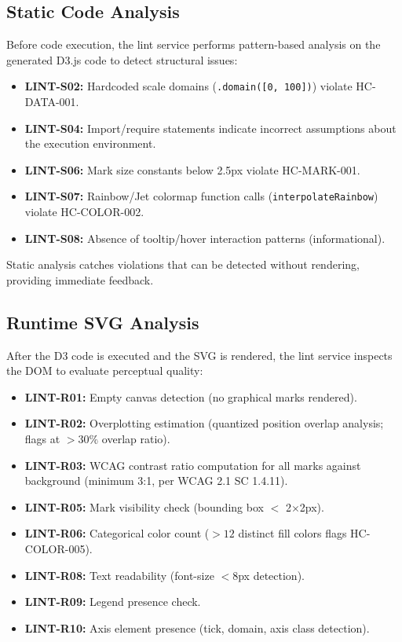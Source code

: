 \documentclass[journal]{vgtc}
\begin{document}
\subsection{Static Code Analysis}

Before code execution, the lint service performs pattern-based analysis on the generated D3.js code to detect structural issues:

\begin{itemize}
\item \textbf{LINT-S02:} Hardcoded scale domains (\texttt{.domain([0, 100])}) violate HC-DATA-001.
\item \textbf{LINT-S04:} Import/require statements indicate incorrect assumptions about the execution environment.
\item \textbf{LINT-S06:} Mark size constants below 2.5px violate HC-MARK-001.
\item \textbf{LINT-S07:} Rainbow/Jet colormap function calls (\texttt{interpolateRainbow}) violate HC-COLOR-002.
\item \textbf{LINT-S08:} Absence of tooltip/hover interaction patterns (informational).
\end{itemize}

Static analysis catches violations that can be detected without rendering, providing immediate feedback.

\subsection{Runtime SVG Analysis}

After the D3 code is executed and the SVG is rendered, the lint service inspects the DOM to evaluate perceptual quality:

\begin{itemize}
\item \textbf{LINT-R01:} Empty canvas detection (no graphical marks rendered).
\item \textbf{LINT-R02:} Overplotting estimation (quantized position overlap analysis; flags at $>30\%$ overlap ratio).
\item \textbf{LINT-R03:} WCAG contrast ratio computation for all marks against background (minimum 3:1, per WCAG 2.1 SC 1.4.11).
\item \textbf{LINT-R05:} Mark visibility check (bounding box $<$ 2$\times$2px).
\item \textbf{LINT-R06:} Categorical color count ($>12$ distinct fill colors flags HC-COLOR-005).
\item \textbf{LINT-R08:} Text readability (font-size $< 8$px detection).
\item \textbf{LINT-R09:} Legend presence check.
\item \textbf{LINT-R10:} Axis element presence (tick, domain, axis class detection).
\end{itemize}
\end{document}
